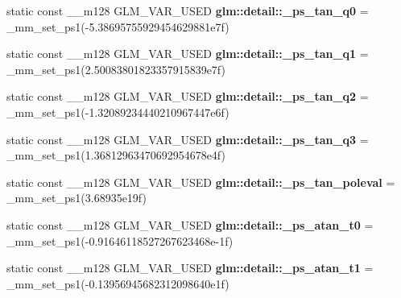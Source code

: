 \begin{DoxyCompactItemize}
\item 
\hypertarget{namespaceglm_1_1detail_a1e70a76fbaba18db3c4c4a83265e4f28}{}static const \+\_\+\+\_\+m128 G\+L\+M\+\_\+\+V\+A\+R\+\_\+\+U\+S\+E\+D {\bfseries glm\+::detail\+::\+\_\+ps\+\_\+tan\+\_\+q0} = \+\_\+mm\+\_\+set\+\_\+ps1(-\/5.\+38695755929454629881e7f)\label{namespaceglm_1_1detail_a1e70a76fbaba18db3c4c4a83265e4f28}

\item 
\hypertarget{namespaceglm_1_1detail_a7daf77ca81f6e387eae333b45210caff}{}static const \+\_\+\+\_\+m128 G\+L\+M\+\_\+\+V\+A\+R\+\_\+\+U\+S\+E\+D {\bfseries glm\+::detail\+::\+\_\+ps\+\_\+tan\+\_\+q1} = \+\_\+mm\+\_\+set\+\_\+ps1(2.\+50083801823357915839e7f)\label{namespaceglm_1_1detail_a7daf77ca81f6e387eae333b45210caff}

\item 
\hypertarget{namespaceglm_1_1detail_a0524f38618055ab8bf078f2fc427d4f7}{}static const \+\_\+\+\_\+m128 G\+L\+M\+\_\+\+V\+A\+R\+\_\+\+U\+S\+E\+D {\bfseries glm\+::detail\+::\+\_\+ps\+\_\+tan\+\_\+q2} = \+\_\+mm\+\_\+set\+\_\+ps1(-\/1.\+32089234440210967447e6f)\label{namespaceglm_1_1detail_a0524f38618055ab8bf078f2fc427d4f7}

\item 
\hypertarget{namespaceglm_1_1detail_a53dd1216ca7bee919c0107263c979286}{}static const \+\_\+\+\_\+m128 G\+L\+M\+\_\+\+V\+A\+R\+\_\+\+U\+S\+E\+D {\bfseries glm\+::detail\+::\+\_\+ps\+\_\+tan\+\_\+q3} = \+\_\+mm\+\_\+set\+\_\+ps1(1.\+36812963470692954678e4f)\label{namespaceglm_1_1detail_a53dd1216ca7bee919c0107263c979286}

\item 
\hypertarget{namespaceglm_1_1detail_a2dab1445d759941e4ec92692f6ba693a}{}static const \+\_\+\+\_\+m128 G\+L\+M\+\_\+\+V\+A\+R\+\_\+\+U\+S\+E\+D {\bfseries glm\+::detail\+::\+\_\+ps\+\_\+tan\+\_\+poleval} = \+\_\+mm\+\_\+set\+\_\+ps1(3.\+68935e19f)\label{namespaceglm_1_1detail_a2dab1445d759941e4ec92692f6ba693a}

\item 
\hypertarget{namespaceglm_1_1detail_a794a4b3513a6c74984c24c421aa299a3}{}static const \+\_\+\+\_\+m128 G\+L\+M\+\_\+\+V\+A\+R\+\_\+\+U\+S\+E\+D {\bfseries glm\+::detail\+::\+\_\+ps\+\_\+atan\+\_\+t0} = \+\_\+mm\+\_\+set\+\_\+ps1(-\/0.\+91646118527267623468e-\/1f)\label{namespaceglm_1_1detail_a794a4b3513a6c74984c24c421aa299a3}

\item 
\hypertarget{namespaceglm_1_1detail_a529d492db362a40fdb79195ced41ca01}{}static const \+\_\+\+\_\+m128 G\+L\+M\+\_\+\+V\+A\+R\+\_\+\+U\+S\+E\+D {\bfseries glm\+::detail\+::\+\_\+ps\+\_\+atan\+\_\+t1} = \+\_\+mm\+\_\+set\+\_\+ps1(-\/0.\+13956945682312098640e1f)\label{namespaceglm_1_1detail_a529d492db362a40fdb79195ced41ca01}


\end{DoxyCompactItemize}

